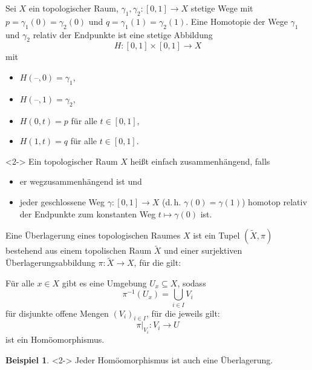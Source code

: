 \documentclass{beamer}
\newcommand{\I}{\left[0,1\right]} %
\renewcommand{\emph}[1]{\textcolor{Emph}{#1}}
\newcommand{\blank}{\text{--}}
\theoremstyle{definition}
\newtheorem*{bsp}{Beispiel}
\begin{document}
\begin{frame}
  \begin{definition}
    Sei $X$ ein topologischer Raum, $\gamma_1, \gamma_2 : \left[ 0, 1 \right] \to X$ stetige Wege mit $p = \gamma_1(0) = \gamma_2(0)$ und $q = \gamma_1(1) = \gamma_2(1)$. Eine \emph{Homotopie} der Wege $\gamma_1$ und $\gamma_2$ relativ der Endpunkte ist eine stetige Abbildung
    \[ H : \I \times \I \to X \]
    mit
    \begin{itemize}
      \item $H(\blank, 0) = \gamma_1$,
      \item $H(\blank, 1) = \gamma_2$,
      \item $H(0, t) = p$ für alle $t \in \I$,
      \item $H(1, t) = q$ für alle $t \in \I$.
    \end{itemize}
  \end{definition}

  \begin{definition}<2->
    Ein topologischer Raum $X$ heißt \emph{einfach zusammenhängend}, falls
    \begin{itemize}
      \item er wegzusammenhängend ist und
      \item jeder geschlossene Weg $\gamma : \I \to X$ (d.\,h. $\gamma(0) = \gamma(1)$) homotop relativ der Endpunkte zum konstanten Weg $t \mapsto \gamma(0)$ ist.
    \end{itemize}
  \end{definition}
\end{frame}

\begin{frame}
  \begin{definition}
    
    Eine \emph{Überlagerung} eines topologischen Raumes $X$ ist ein Tupel $(\tilde{X}, \pi)$ bestehend aus einem topolischen Raum $\tilde{X}$ und einer surjektiven Überlagerungsabbildung $\pi : \tilde{X} \to X$, für die gilt:

    Für alle $x \in X$ gibt es eine Umgebung $U_x \subseteq X$, sodass
    \[ \pi^{-1}(U_x) = \bigcup_{i \in I} V_i \]
    für disjunkte offene Mengen $(V_i)_{i \in I}$, für die jeweils gilt:
    \[ \pi|_{V_i} : V_i \to U \]
    ist ein Homöomorphismus.
  \end{definition}

  \begin{bsp}<2->
    Jeder Homöomorphismus ist auch eine Überlagerung.
  \end{bsp}
\end{frame}
\end{document}
